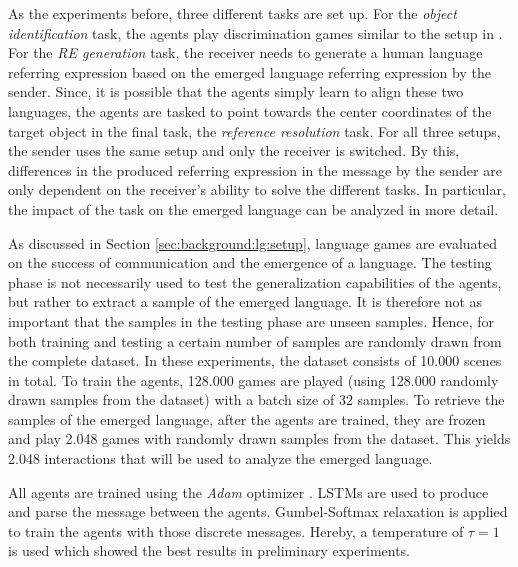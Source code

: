 As the experiments before, three different tasks are set up.
For the \emph{object identification} task, the agents play discrimination games similar to the setup in \citep{Lazaridou2017}.
For the \emph{RE generation} task, the receiver needs to generate a human language referring expression based on the emerged language referring expression by the sender.
Since, it is possible that the agents simply learn to align these two languages, the agents are tasked to point towards the center coordinates of the target object in the final task, the \emph{reference resolution} task.
For all three setups, the sender uses the same setup and only the receiver is switched.
By this, differences in the produced referring expression in the message by the sender are only dependent on the receiver's ability to solve the different tasks.
In particular, the impact of the task on the emerged language can be analyzed in more detail.

As discussed in Section \ref{sec:background:lg:setup}, language games are evaluated on the success of communication and the emergence of a language.
The testing phase is not necessarily used to test the generalization capabilities of the agents, but rather to extract a sample of the emerged language.
It is therefore not as important that the samples in the testing phase are unseen samples.
Hence, for both training and testing a certain number of samples are randomly drawn from the complete dataset.
In these experiments, the dataset consists of 10.000 scenes in total.
To train the agents, 128.000 games are played (using 128.000 randomly drawn samples from the dataset) with a batch size of 32 samples.
To retrieve the samples of the emerged language, after the agents are trained, they are frozen and play 2.048 games with randomly drawn samples from the dataset.
This yields 2.048 interactions that will be used to analyze the emerged language.

All agents are trained using the \emph{Adam} optimizer \citep{Kingma2015}.
LSTMs are used to produce and parse the message between the agents.
Gumbel-Softmax relaxation is applied to train the agents with those discrete messages.
Hereby, a temperature of $\tau=1$ is used which showed the best results in preliminary experiments.